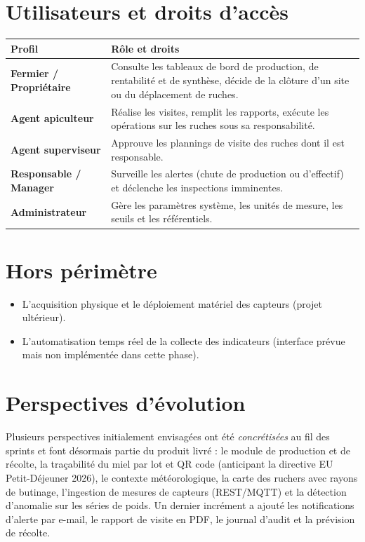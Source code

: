\section{Utilisateurs et droits d'accès}
\begin{xltabular}{\textwidth}{>{\bfseries}p{3.2cm} X}
\toprule
\textbf{Profil} & \textbf{Rôle et droits} \\
\midrule
\endhead
Fermier / Propriétaire & Consulte les tableaux de bord de production, de rentabilité et de synthèse, décide de la clôture d'un site ou du déplacement de ruches. \\
Agent apiculteur & Réalise les visites, remplit les rapports, exécute les opérations sur les ruches sous sa responsabilité. \\
Agent superviseur & Approuve les plannings de visite des ruches dont il est responsable. \\
Responsable / Manager & Surveille les alertes (chute de production ou d'effectif) et déclenche les inspections imminentes. \\
Administrateur & Gère les paramètres système, les unités de mesure, les seuils et les référentiels. \\
\bottomrule
\end{xltabular}

\section{Hors périmètre}
\begin{itemize}
  \item L'acquisition physique et le déploiement matériel des capteurs (projet ultérieur).
  \item L'automatisation temps réel de la collecte des indicateurs (interface prévue mais non implémentée dans cette phase).
\end{itemize}

\section{Perspectives d'évolution}
Plusieurs perspectives initialement envisagées ont été \emph{concrétisées} au fil des
sprints et font désormais partie du produit livré : le module de production et de
récolte, la traçabilité du miel par lot et QR code (anticipant la directive EU
Petit-Déjeuner 2026), le contexte météorologique, la carte des ruchers avec rayons
de butinage, l'ingestion de mesures de capteurs (REST/MQTT) et la détection
d'anomalie sur les séries de poids. Un dernier incrément a ajouté les notifications
d'alerte par e-mail, le rapport de visite en PDF, le journal d'audit et la prévision
de récolte.

